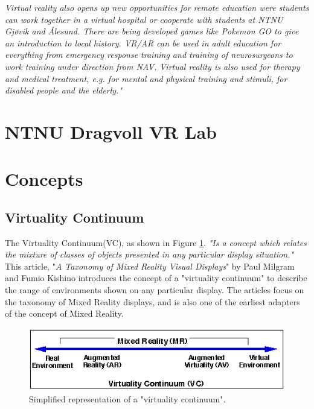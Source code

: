         \emph{Virtual reality also opens up new opportunities for remote education were students can work together in a virtual hospital or cooperate with students at NTNU Gjøvik and Ålesund. There are being developed games like Pokemon GO to give an introduction to local history. VR/AR can be used in adult education for everything from emergency response training and training of neurosurgeons to work training under direction from NAV. Virtual reality is also used for therapy and medical treatment, e.g. for mental and physical training and stimuli, for disabled people and the elderly."} \cite{EiTVRLandsby}
        
    \section{NTNU Dragvoll VR Lab}

    \section{Concepts}
    
        \subsection{Virtuality Continuum}
        The Virtuality Continuum(VC), as shown in Figure \ref{fig:virtualcontinuum}. \emph{"Is a concept which relates the mixture of classes of objects presented in any particular display situation."}\cite{Milgram1994} This article, "\emph{A Taxonomy of Mixed Reality Visual Displays}" by Paul Milgram and Fumio Kishino\cite{Milgram1994} introduces the concept of a "virtuality continuum" to describe the range of environments shown on any particular display. The articles focus on the taxonomy of Mixed Reality displays, and is also one of the earliest adapters of the concept of Mixed Reality.
        \begin{figure}[!ht]
            \centering
            \includegraphics[scale=1]{figures/virtualcontinuum.png}
            \caption{Simplified representation of a "virtuality continuum".\cite{Milgram1994}}
            \label{fig:virtualcontinuum}
        \end{figure}
        
